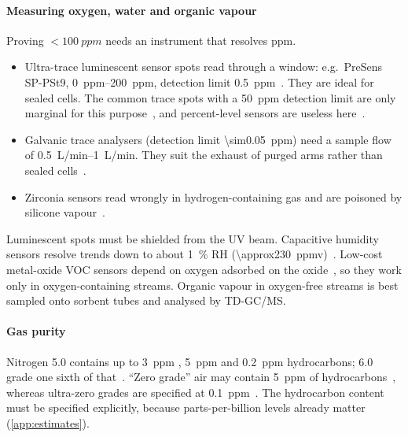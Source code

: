 \paragraph{Measuring oxygen, water and organic vapour} Proving $<\SI{100}{ppm}$ needs an instrument that
resolves ppm.
\begin{itemize}
  \item Ultra-trace luminescent sensor spots read through a window: e.g.\ PreSens SP-PSt9,
        \SIrange{0}{200}{ppm}, detection limit \SI{0.5}{ppm}~\cite{PreSensPSt9}. They are ideal for
        sealed cells. The common trace spots with a \SI{50}{ppm} detection limit are only marginal for this
        purpose~\cite{PyroTROX}, and percent-level sensors are useless here~\cite{LuminOx}.
  \item Galvanic trace analysers (detection limit \SI{\sim0.05}{ppm}) need a sample flow of
        \SIrange{0.5}{1}{L/min}. They suit the exhaust of purged arms rather than sealed
        cells~\cite{GPR1200}.
  \item Zirconia sensors read wrongly in hydrogen-containing gas and are poisoned by silicone
        vapour~\cite{PSTzirconia}.
\end{itemize}
Luminescent spots must be shielded from the UV beam. Capacitive humidity sensors resolve trends down to
about \SI{1}{\percent} RH (\SI{\approx230}{ppmv})~\cite{SHT4x}. Low-cost metal-oxide VOC sensors depend on
oxygen adsorbed on the oxide~\cite{Barsan2001}, so they work only in oxygen-containing streams. Organic
vapour in oxygen-free streams is best sampled onto sorbent tubes and analysed by TD-GC/MS.

\paragraph{Gas purity} Nitrogen 5.0 contains up to \SI{3}{ppm} \Oxy, \SI{5}{ppm} \water{} and
\SI{0.2}{ppm} hydrocarbons; 6.0 grade one sixth of that~\cite{LindeN2}. ``Zero grade'' air may contain
\SI{5}{ppm} of hydrocarbons~\cite{BOCzero}, whereas ultra-zero grades are specified at
\SI{0.1}{ppm}~\cite{AirgasUZ}. The hydrocarbon content must be specified explicitly, because
parts-per-billion levels already matter (\cref{app:estimates}).

